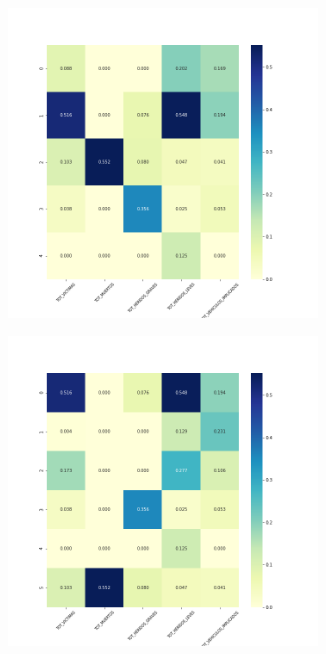 \begin{figure}[H]
\begin{subfigure}{.5\textwidth}
\end{subfigure}
\begin{subfigure}{.5\textwidth}
  \centering
  \includegraphics[width=0.9\textwidth]{imagenes/case2/agglomerative/heatmaps/hm_agglomerative_case2_salida_k5.png}
\end{subfigure}
\begin{subfigure}{.5\textwidth}
  \centering
  \includegraphics[width=0.9\textwidth]{imagenes/case2/agglomerative/heatmaps/hm_agglomerative_case2_salida_k6.png}

\end{subfigure}
\end{figure}
